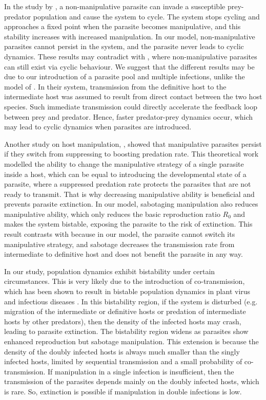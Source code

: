 \documentclass[a4paper]{scrartcl}
\begin{document}
In the study by \cite{Rogawa2018}, a non-manipulative parasite can invade a susceptible prey-predator population and cause the system to cycle. 
The system stops cycling and approaches a fixed point when the parasite becomes manipulative, and this stability increases with increased manipulation.
In our model, non-manipulative parasites cannot persist in the system, and the parasite never leads to cyclic dynamics. 
These results may contradict with \cite{Rogawa2018}, where non-manipulative parasites can still exist via cyclic behaviour. 
We suggest that the different results may be due to our introduction of a parasite pool and multiple infections, unlike the model of \cite{Rogawa2018}. 
In their system, transmission from the definitive host to the intermediate host was assumed to result from direct contact between the two host species. 
Such immediate transmission could directly accelerate the feedback loop between prey and predator. 
Hence, faster predator-prey dynamics occur, which may lead to cyclic dynamics when parasites are introduced.

Another study on host manipulation, \cite{Iritani2018}, showed that manipulative parasites persist if they switch from suppressing to boosting predation rate.
This theoretical work modelled the ability to change the manipulative strategy of a single parasite inside a host, which can be equal to introducing the developmental state of a parasite, where a suppressed predation rate protects the parasites that are not ready to transmit.
That is why decreasing manipulative ability is beneficial and prevents parasite extinction.
In our model, sabotaging manipulation also reduces manipulative ability, which only reduces the basic reproduction ratio $R_0$ and makes the system bistable, exposing the parasite to the risk of extinction. 
This result contrasts with \cite{Iritani2018} because in our model, the parasite cannot switch its manipulative strategy, and sabotage decreases the transmission rate from intermediate to definitive host and does not benefit the parasite in any way. 

In our study, population dynamics exhibit bistability under certain circumstances. 
This is very likely due to the introduction of co-transmission, which has been shown to result in bistable population dynamics in plant virus \cite{allen_modelling_2019} and infectious diseases \cite{gao_coinfection_2016-1}.
 In this bistability region, if the system is disturbed (e.g. migration of the intermediate or definitive hosts or predation of intermediate hosts by other predators), then the density of the infected hosts may crash, leading to parasite extinction. 
The bistability region widens as parasites show enhanced reproduction but sabotage manipulation. 
This extension is because the density of the doubly infected hosts is always much smaller than the singly infected hosts, limited by sequential transmission and a small probability of co-transmission. 
If manipulation in a single infection is insufficient, then the transmission of the parasites depends mainly on the doubly infected hosts, which is rare. 
So, extinction is possible if manipulation in double infections is low.
\end{document}
